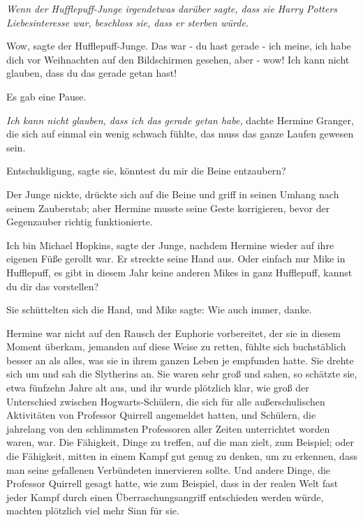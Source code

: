 \emph{Wenn der Hufflepuff-Junge irgendetwas darüber sagte, dass sie Harry Potters Liebesinteresse war, beschloss sie, dass er sterben würde.}

\glqq Wow\grqq{}, sagte der Hufflepuff-Junge. \glqq Das war - du hast gerade -
ich meine, ich habe dich vor Weihnachten auf den Bildschirmen gesehen, aber -
wow! Ich kann nicht glauben, dass du das gerade getan hast!\grqq{}

Es gab eine Pause.

\emph{Ich kann nicht glauben, dass ich das gerade getan habe,} dachte Hermine
Granger, die sich auf einmal ein wenig schwach fühlte, das muss das ganze Laufen
gewesen sein.

\glqq Entschuldigung\grqq{}, sagte sie, \glqq könntest du mir die Beine
entzaubern?\grqq{}

Der Junge nickte, drückte sich auf die Beine und griff in seinen Umhang nach
seinem Zauberstab; aber Hermine musste seine Geste korrigieren, bevor der
Gegenzauber richtig funktionierte.

\glqq Ich bin Michael Hopkins\grqq{}, sagte der Junge, nachdem Hermine wieder
auf ihre eigenen Füße gerollt war. Er streckte seine Hand aus. \glqq Oder
einfach nur Mike in Hufflepuff, es gibt in diesem Jahr keine anderen Mikes in
ganz Hufflepuff, kannst du dir das vorstellen?\grqq{}

Sie schüttelten sich die Hand, und Mike sagte: \glqq Wie auch immer,
danke.\grqq{}

Hermine war nicht auf den Rausch der Euphorie vorbereitet, der sie in diesem
Moment überkam, jemanden auf diese Weise zu retten, fühlte sich buchstäblich
besser an als alles, was sie in ihrem ganzen Leben je empfunden hatte. Sie
drehte sich um und sah die Slytherins an. Sie waren sehr groß und sahen, so
schätzte sie, etwa fünfzehn Jahre alt aus, und ihr wurde plötzlich klar, wie
groß der Unterschied zwischen Hogwarts-Schülern, die sich für alle
außerschulischen Aktivitäten von Professor Quirrell angemeldet hatten, und
Schülern, die jahrelang von den schlimmsten Professoren aller Zeiten
unterrichtet worden waren, war. Die Fähigkeit, Dinge zu treffen, auf die man
zielt, zum Beispiel; oder die Fähigkeit, mitten in einem Kampf gut genug zu
denken, um zu erkennen, dass man seine gefallenen Verbündeten innervieren
sollte. Und andere Dinge, die Professor Quirrell gesagt hatte, wie zum Beispiel,
dass in der realen Welt fast jeder Kampf durch einen Überraschungsangriff
entschieden werden würde, machten plötzlich viel mehr Sinn für sie.

